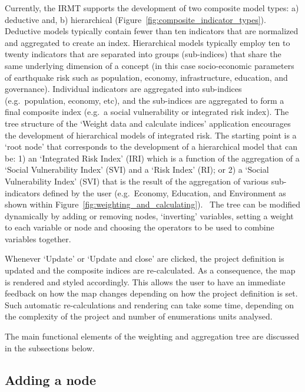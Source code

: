 Currently, the IRMT supports the development of two composite model types: a)
deductive and, b) hierarchical (Figure~\ref{fig:composite_indicator_types}).
Deductive models typically contain fewer than ten indicators that are
normalized and aggregated to create an index. Hierarchical models typically
employ ten to twenty indicators that are separated into groups (sub-indices)
that share the same underlying dimension of a concept (in this case
socio-economic parameters of earthquake risk such as population, economy,
infrastructure, education, and governance).  Individual indicators are
aggregated into sub-indices (e.g.\ population, economy, etc), and the
sub-indices are aggregated to form a final composite index (e.g.\ a social
vulnerability or integrated risk index). The tree structure of the `Weight data
and calculate indices' application encourages the development of hierarchical
models of integrated risk. The starting point is a `root node' that corresponds
to the development of a hierarchical model that can be: 1) an `Integrated Risk
Index' (IRI) which is a function of the aggregation of a `Social Vulnerability
Index' (SVI) and a `Risk Index' (RI); or 2) a `Social Vulnerability Index'
(SVI) that is the result of the aggregation of various sub-indicators defined
by the user (e.g.\ Economy, Education, and Environment as shown within
Figure~\ref{fig:weighting_and_calculating}).  The tree can be modified
dynamically by adding or removing nodes, `inverting' variables, setting a
weight to each variable or node and choosing the operators to be used to
combine variables together.

Whenever `Update' or `Update and close' are clicked, the project definition is
updated and the composite indices are re-calculated. As a consequence, the map
is rendered and styled accordingly. This allows the user to have an immediate
feedback on how the map changes depending on how the project definition is set.
Such automatic re-calculations and rendering can take some time, depending on
the complexity of the project and number of enumerations units analysed.

The main functional elements of the weighting and aggregation tree are
discussed in the subsections below.


\subsection{Adding a node}

